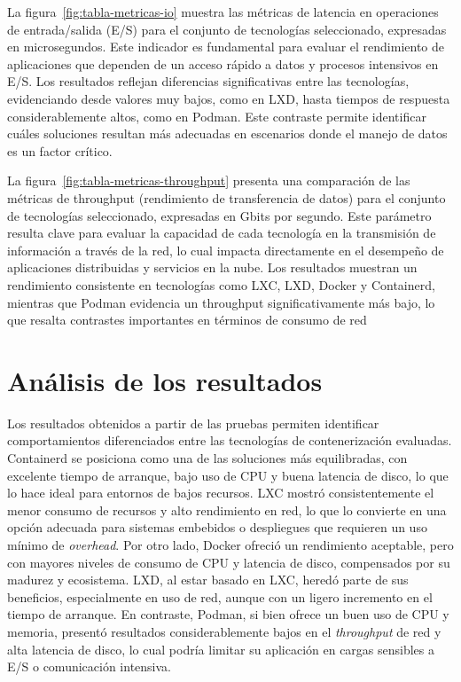 \noindent
La figura~\ref{fig:tabla-metricas-io} muestra las métricas de latencia en operaciones de entrada/salida (E/S) para el conjunto de tecnologías seleccionado, expresadas en microsegundos. Este indicador es fundamental para evaluar el rendimiento de aplicaciones que dependen de un acceso rápido a datos y procesos intensivos en E/S. Los resultados reflejan diferencias significativas entre las tecnologías, evidenciando desde valores muy bajos, como en LXD, hasta tiempos de respuesta considerablemente altos, como en Podman. Este contraste permite identificar cuáles soluciones resultan más adecuadas en escenarios donde el manejo de datos es un factor crítico.


\noindent
La figura~\ref{fig:tabla-metricas-throughput} presenta una comparación de las métricas de throughput (rendimiento de transferencia de datos) para el conjunto de tecnologías seleccionado, expresadas en Gbits por segundo. Este parámetro resulta clave para evaluar la capacidad de cada tecnología en la transmisión de información a través de la red, lo cual impacta directamente en el desempeño de aplicaciones distribuidas y servicios en la nube. Los resultados muestran un rendimiento consistente en tecnologías como LXC, LXD, Docker y Containerd, mientras que Podman evidencia un throughput significativamente más bajo, lo que resalta contrastes importantes en términos de consumo de red


\section{Análisis de los resultados}
\noindent
Los resultados obtenidos a partir de las pruebas permiten identificar comportamientos diferenciados entre las tecnologías de contenerización evaluadas. Containerd se posiciona como una de las soluciones más equilibradas, con excelente tiempo de arranque, bajo uso de CPU y buena latencia de disco, lo que lo hace ideal para entornos de bajos recursos.
LXC mostró consistentemente el menor consumo de recursos y alto rendimiento en red, lo que lo convierte en una opción adecuada para sistemas embebidos o despliegues que requieren un uso mínimo de \textit{overhead}. 
Por otro lado, Docker ofreció un rendimiento aceptable, pero con mayores niveles de consumo de CPU y latencia de disco, compensados por su madurez y ecosistema. 
LXD, al estar basado en LXC, heredó parte de sus beneficios, especialmente en uso de red, aunque con un ligero incremento en el tiempo de arranque.
En contraste, Podman, si bien ofrece un buen uso de CPU y memoria, presentó resultados considerablemente bajos en el \textit{throughput} de red y alta latencia de disco, lo cual podría limitar su aplicación en cargas sensibles a E/S o comunicación intensiva.

